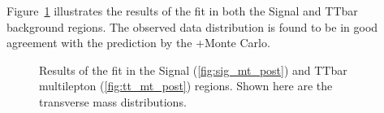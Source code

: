 %
%

Figure~\ref{fig:postfits} illustrates the results of the fit in both the Signal and TTbar background regions. 
The observed data distribution is found to be in good agreement with the prediction by the \MADGRAPH+\PYTHIA Monte Carlo. 

\begin{figure}
\center
{}
\caption{Results of the fit in the Signal (\ref{fig:sig_mt_post}) and TTbar multilepton (\ref{fig:tt_mt_post}) regions. Shown here are the transverse mass distributions.}
\label{fig:postfits}
\end{figure}


